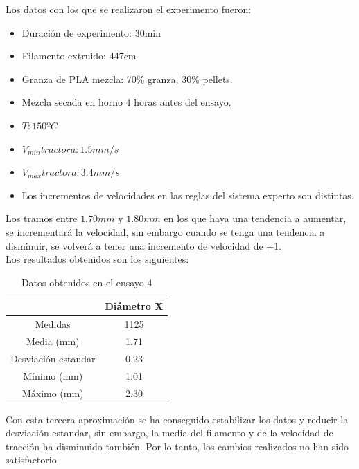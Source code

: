 Los datos con los que se realizaron el experimento fueron:

\begin{itemize}
	\item{Duración de experimento: 30min}
	\item{Filamento extruido: 447cm}
	\item{Granza de PLA mezcla: 70\% granza, 30\% pellets.}
	\item{Mezcla secada en horno 4 horas antes del ensayo.}
	\item{$T: 150ºC$}
	\item{$V_{min} tractora: 1.5 mm/s$}
	\item{$V_{max} tractora: 3.4 mm/s$}
	\item{Los incrementos de velocidades en las reglas del sistema experto son distintas.}
\end{itemize}

 Los tramos entre $1.70 mm$ y $1.80mm$ en los que haya una tendencia a aumentar, se incrementará la velocidad, sin embargo cuando se tenga una tendencia a disminuir, se volverá a tener una incremento de velocidad de +1.\\

Los resultados obtenidos son los siguientes:

\begin{table}[H]
	\centering
	\begin{tabular}{cc}
		                    & Diámetro X \\ \hline
		Medidas             & 1125      \\
		Media (mm)          & 1.71       \\
		Desviación estandar & 0.23       \\
		Mínimo (mm)         & 1.01       \\
		Máximo (mm)         & 2.30      
	\end{tabular}
	\caption{Datos obtenidos en el ensayo 4}
	\label{tab:resl_ens4}
\end{table}

Con esta tercera aproximación se ha conseguido estabilizar los datos y reducir la desviación estandar, sin embargo, la media del filamento y de la velocidad de tracción ha disminuido también. Por lo tanto, los cambios realizados no han sido satisfactorio


